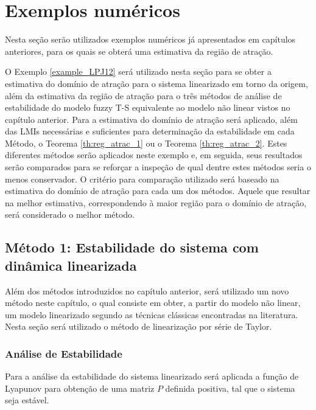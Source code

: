 \section{Exemplos numéricos}

Nesta seção serão utilizados exemplos numéricos já apresentados em capítulos anteriores, para os quais se obterá uma estimativa da região de atração.


O Exemplo \ref{example_LPJ12} será utilizado nesta seção para se obter a estimativa do domínio de atração para o sistema linearizado em torno da origem, além da estimativa da região de atração para o três métodos de análise de estabilidade do modelo fuzzy T-S equivalente ao modelo não linear vistos no capítulo anterior. Para a estimativa do domínio de atração será aplicado, além das LMIs necessárias e suficientes para determinação da estabilidade em cada Método, o Teorema \ref{th:reg_atrac_1} ou o Teorema \ref{th:reg_atrac_2}. Estes diferentes métodos serão aplicados neste exemplo e, em seguida, seus resultados serão comparados para se reforçar a inspeção de qual dentre estes métodos seria o menos conservador. O critério para comparação utilizado será baseado na estimativa do domínio de atração para cada um dos métodos. Aquele que resultar na melhor estimativa, correspondendo à maior região para o domínio de atração, será considerado o melhor método.

\subsection{Método 1: Estabilidade do sistema com dinâmica linearizada}

Além dos métodos introduzidos no capítulo anterior, será utilizado um novo método neste capítulo, o qual consiste em obter, a partir do modelo não linear, um modelo linearizado segundo as técnicas clássicas encontradas na literatura. Nesta seção será utilizado o método de linearização por série de Taylor.

\subsubsection*{Análise de Estabilidade}

Para a análise da estabilidade do sistema linearizado será aplicada a função de Lyapunov para obtenção de uma matriz $P$ definida positiva, tal que o sistema seja estável.

